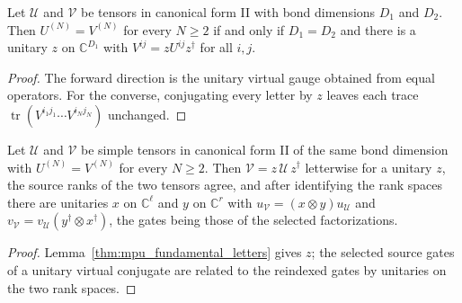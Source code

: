 \begin{lemma}
    \label{thm:mpu_fundamental_letters}
    \leanok
    Let $\mathcal U$ and $\mathcal V$ be tensors in canonical form II with
    bond dimensions $D_1$ and $D_2$. Then $U^{(N)}=V^{(N)}$ for every
    $N\ge 2$ if and only if $D_1=D_2$ and there is a unitary $z$ on
    $\mathbb C^{D_1}$ with $V^{ij}=zU^{ij}z^\dagger$ for all $i,j$.
\end{lemma}
\begin{proof}\leanok
    The forward direction is the unitary virtual gauge obtained from equal
    operators. For the converse, conjugating every letter by $z$ leaves each
    trace $\operatorname{tr}(V^{i_1j_1}\cdots V^{i_Nj_N})$ unchanged.
\end{proof}

\begin{lemma}
    \label{thm:mpu_fundamental_gates_necessity}
    \leanok
    Let $\mathcal U$ and $\mathcal V$ be simple tensors in canonical form II
    of the same bond dimension with $U^{(N)}=V^{(N)}$ for every $N\ge2$. Then
    $\mathcal V=z\,\mathcal U\,z^\dagger$ letterwise for a unitary $z$, the
    source ranks of the two tensors agree, and after identifying the rank
    spaces there are unitaries $x$ on $\mathbb C^{\ell}$ and $y$ on
    $\mathbb C^{r}$ with $u_{\mathcal V}=(x\otimes y)u_{\mathcal U}$ and
    $v_{\mathcal V}=v_{\mathcal U}(y^\dagger\otimes x^\dagger)$, the gates
    being those of the selected factorizations.
\end{lemma}
\begin{proof}\leanok
    Lemma~\ref{thm:mpu_fundamental_letters} gives $z$; the selected source
    gates of a unitary virtual conjugate are related to the reindexed gates
    by unitaries on the two rank spaces.
\end{proof}

